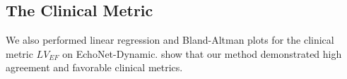 \subsection{The Clinical Metric}
We also performed linear regression and Bland-Altman plots for the clinical metric $LV_{EF}$ on EchoNet-Dynamic.
 show that our method demonstrated high agreement and favorable clinical metrics.
